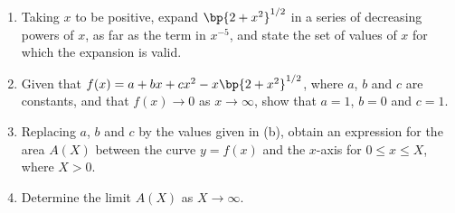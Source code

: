\begin{problem}
    \begin{enumerate}
        \item Taking $x$ to be positive, expand $\bp{2 + x^2}^{1/2}$ in a series of decreasing powers of $x$, as far as the term in $x^{-5}$, and state the set of values of $x$ for which the expansion is valid.
        \item Given that $f(x) = a + bx + cx^2 - x\bp{2 + x^2}^{1/2}$, where $a$, $b$ and $c$ are constants, and that $f(x) \to 0$ as $x \to \infty$, show that $a = 1$, $b = 0$ and $c = 1$.
        \item Replacing $a$, $b$ and $c$ by the values given in (b), obtain an expression for the area $A(X)$ between the curve $y = f(x)$ and the $x$-axis for $0 \leq x \leq X$, where $X > 0$.
        \item Determine the limit $A(X)$ as $X \to \infty$.
    \end{enumerate}
\end{problem}

